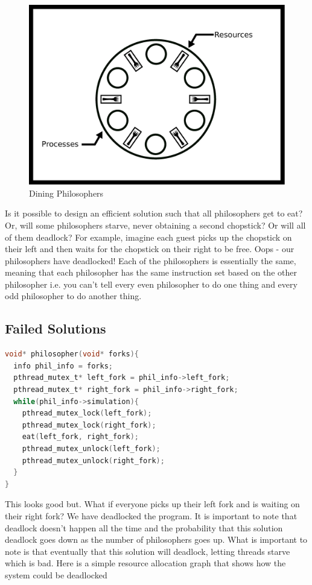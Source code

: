 \begin{figure}[H]
\centering
\includegraphics[width=.5\textwidth]{deadlock/drawings/dining.eps}
\caption{Dining Philosophers}
\end{figure}

Is it possible to design an efficient solution such that all philosophers get to eat?
Or, will some philosophers starve, never obtaining a second chopstick?
Or will all of them deadlock?
For example, imagine each guest picks up the chopstick on their left and then waits for the chopstick on their right to be free.
Oops - our philosophers have deadlocked!
Each of the philosophers is essentially the same, meaning that each philosopher has the same instruction set based on the other philosopher i.e. you can't tell every even philosopher to do one thing and every odd philosopher to do another thing.

\subsection{Failed Solutions}

\begin{lstlisting}[language=C]
void* philosopher(void* forks){
  info phil_info = forks;
  pthread_mutex_t* left_fork = phil_info->left_fork;
  pthread_mutex_t* right_fork = phil_info->right_fork;
  while(phil_info->simulation){
    pthread_mutex_lock(left_fork);
    pthread_mutex_lock(right_fork);
    eat(left_fork, right_fork);
    pthread_mutex_unlock(left_fork);
    pthread_mutex_unlock(right_fork);
  }
}
\end{lstlisting}

This looks good but.
What if everyone picks up their left fork and is waiting on their right fork? We have deadlocked the program.
It is important to note that deadlock doesn't happen all the time and the probability that this solution deadlock goes down as the number of philosophers goes up.
What is important to note is that eventually that this solution will deadlock, letting threads starve which is bad.
Here is a simple resource allocation graph that shows how the system could be deadlocked

